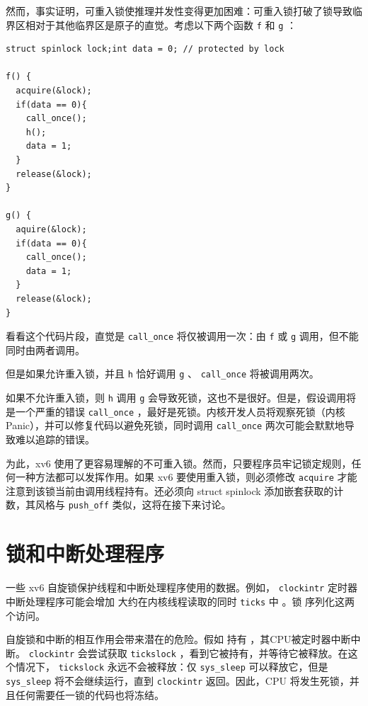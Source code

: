 然而，事实证明，可重入锁使推理并发性变得更加困难：可重入锁打破了锁导致临界区相对于其他临界区是原子的直觉。考虑以下两个函数    \lstinline{f}    和
    \lstinline{g}   ：  

   \begin{lstlisting}struct spinlock lock;int data = 0; // protected by lock

f() {
  acquire(&lock);
  if(data == 0){
    call_once();
    h();
    data = 1;
  }
  release(&lock);
}

g() {
  aquire(&lock);
  if(data == 0){
    call_once();
    data = 1;
  }
  release(&lock);
}
\end{lstlisting}     

看看这个代码片段，直觉是
    \lstinline{call_once}    将仅被调用一次：由    \lstinline{f}    或    \lstinline{g}    调用，但不能同时由两者调用。  

但是如果允许重入锁，并且    \lstinline{h}    恰好调用
    \lstinline{g}   、   \lstinline{call_once}   将被调用两次。  

如果不允许重入锁，则    \lstinline{h}    调用
    \lstinline{g}    会导致死锁，这也不是很好。但是，假设调用将是一个严重的错误
    \lstinline{call_once}    ，最好是死锁。内核开发人员将观察死锁（内核Panic），并可以修复代码以避免死锁，同时调用
    \lstinline{call_once}    两次可能会默默地导致难以追踪的错误。  

为此，xv6 使用了更容易理解的不可重入锁。然而，只要程序员牢记锁定规则，任何一种方法都可以发挥作用。如果 xv6 要使用重入锁，则必须修改    \lstinline{acquire}    才能注意到该锁当前由调用线程持有。还必须向 struct spinlock 添加嵌套获取的计数，其风格与    \lstinline{push_off}    类似，这将在接下来讨论。  

   \section{锁和中断处理程序  }   
    \label{s:lockinter}    一些 xv6 自旋锁保护线程和中断处理程序使用的数据。例如，
    \lstinline{clockintr}    定时器中断处理程序可能会增加
        大约在内核线程读取的同时
    \lstinline{ticks}    中
       。锁
        序列化这两个访问。  

自旋锁和中断的相互作用会带来潜在的危险。假如
        持有
       ，其CPU被定时器中断中断。
    \lstinline{clockintr}    会尝试获取
    \lstinline{tickslock}    ，看到它被持有，并等待它被释放。在这个情况下，
    \lstinline{tickslock}    永远不会被释放：仅
    \lstinline{sys_sleep}   可以释放它，但是
    \lstinline{sys_sleep}    将不会继续运行，直到
    \lstinline{clockintr}    返回。因此，CPU 将发生死锁，并且任何需要任一锁的代码也将冻结。  

